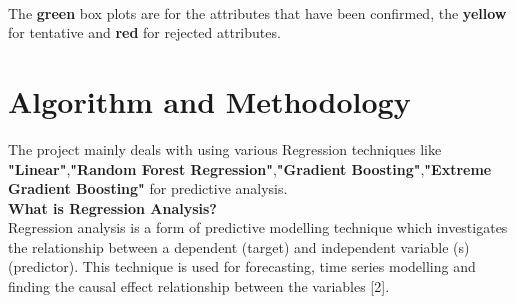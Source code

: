 \documentclass[fleqn,10pt]{SelfArx} %
\begin{document}
\\ The \textbf{green} box plots are for the attributes that have been confirmed, the \textbf{yellow} for tentative and \textbf{red} for rejected attributes.

\section{Algorithm and Methodology}
The project mainly deals with using various Regression techniques like \textbf{"Linear"},\textbf{"Random Forest Regression"},\textbf{"Gradient Boosting"},\textbf{"Extreme Gradient Boosting"} for predictive analysis.
\\ \textbf{What is Regression Analysis?}
\\Regression analysis is a form of predictive modelling technique which investigates the relationship between a dependent (target) and independent variable (s) (predictor). This technique is used for forecasting, time series modelling and finding the causal effect relationship between the variables [2]. 
\end{document}
